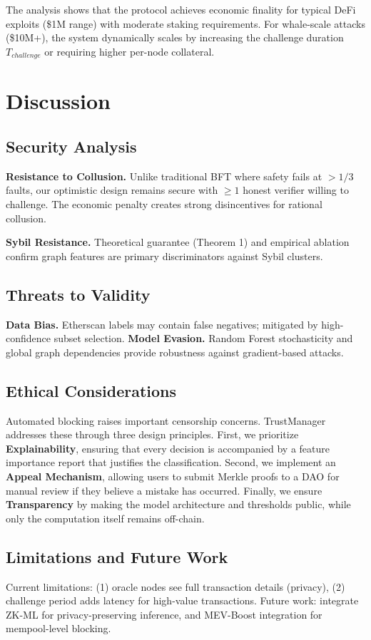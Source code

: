 \documentclass[runningheads]{llncs}
\begin{document}
The analysis shows that the protocol achieves economic finality for typical DeFi exploits (\$1M range) with moderate staking requirements. For whale-scale attacks (\$10M+), the system dynamically scales by increasing the challenge duration $T_{challenge}$ or requiring higher per-node collateral.

\section{Discussion}

\subsection{Security Analysis}
\textbf{Resistance to Collusion.} Unlike traditional BFT where safety fails at $>1/3$ faults, our optimistic design remains secure with $\geq 1$ honest verifier willing to challenge. The economic penalty creates strong disincentives for rational collusion.

\textbf{Sybil Resistance.} Theoretical guarantee (Theorem 1) and empirical ablation confirm graph features are primary discriminators against Sybil clusters.

\subsection{Threats to Validity}
\textbf{Data Bias.} Etherscan labels may contain false negatives; mitigated by high-confidence subset selection.
\textbf{Model Evasion.} Random Forest stochasticity and global graph dependencies provide robustness against gradient-based attacks.

\subsection{Ethical Considerations}
Automated blocking raises important censorship concerns. TrustManager addresses these through three design principles. First, we prioritize \textbf{Explainability}, ensuring that every decision is accompanied by a feature importance report that justifies the classification. Second, we implement an \textbf{Appeal Mechanism}, allowing users to submit Merkle proofs to a DAO for manual review if they believe a mistake has occurred. Finally, we ensure \textbf{Transparency} by making the model architecture and thresholds public, while only the computation itself remains off-chain.

\subsection{Limitations and Future Work}
Current limitations: (1) oracle nodes see full transaction details (privacy), (2) challenge period adds latency for high-value transactions. Future work: integrate ZK-ML for privacy-preserving inference, and MEV-Boost integration for mempool-level blocking.
\end{document}
